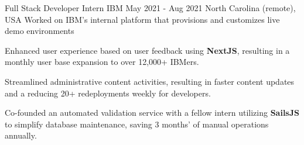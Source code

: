 \begin{cventries}
    \cventry
    {Full Stack Developer Intern} %
    {IBM} %
    {May 2021 - Aug 2021} %
    {North Carolina (remote), USA} %
    {Worked on IBM's internal platform that provisions and customizes live demo environments}
    {
      \begin{cvitems} %
        \item {Enhanced user experience based on user feedback using \textbf{NextJS}, resulting in a monthly user base expansion to over 12,000+ IBMers.}
        \item {Streamlined administrative content activities, resulting in faster content updates and a reducing 20+ redeployments weekly for developers.}
        \item {Co-founded an automated validation service with a fellow intern utilizing \textbf{SailsJS} to simplify database maintenance, saving 3 months' of manual operations annually.}
      \end{cvitems}
    }



\end{cventries}
